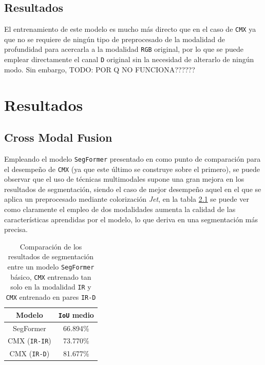 \documentclass[12pt,a4paper]{report}
\begin{document}
\section{Resultados}
\label{sec:dformer_results}
El entrenamiento de este modelo es mucho más directo que en el caso de \texttt{CMX} ya que no se requiere de ningún tipo de preprocesado de la modalidad de profundidad para acercarla a la modalidad \texttt{RGB} original, por lo que se puede emplear directamente el canal \texttt{D} original sin la necesidad de alterarlo de ningún modo. Sin embargo, TODO: POR Q NO FUNCIONA??????

\chapter{Resultados}
\label{chap:results}
\section{Cross Modal Fusion}
\label{sec:cmx_results}
Empleando el modelo \texttt{SegFormer} presentado en \cite{strudel2021segmentertransformersemanticsegmentation} como punto de comparación para el desempeño de \texttt{CMX} (ya que este último se construye sobre el primero), se puede observar que el uso de técnicas multimodales supone una gran mejora en los resultados de segmentación, siendo el caso de mejor desempeño aquel en el que se aplica un preprocesado mediante colorización \textit{Jet}, en la tabla \ref{tab:segformer_cmx_comparison} se puede ver como claramente el empleo de dos modalidades aumenta la calidad de las características aprendidas por el modelo, lo que deriva en una segmentación más precisa.

\begin{table}[!h]
    \centering
    \begin{tabular}{|c|c|}
        \hline
        \textbf{Modelo} & \textbf{\texttt{IoU} medio} \\
        \hline
        SegFormer & 66.894\% \\
        CMX (\texttt{IR-IR}) & 73.770\% \\
        CMX (\texttt{IR-D}) & 81.677\% \\
        \hline
    \end{tabular}
    \caption{Comparación de los resultados de segmentación entre un modelo \texttt{SegFormer} básico, \texttt{CMX} entrenado tan solo en la modalidad \texttt{IR} y \texttt{CMX} entrenado en pares \texttt{IR-D}}
    \label{tab:segformer_cmx_comparison}
\end{table}
\end{document}
